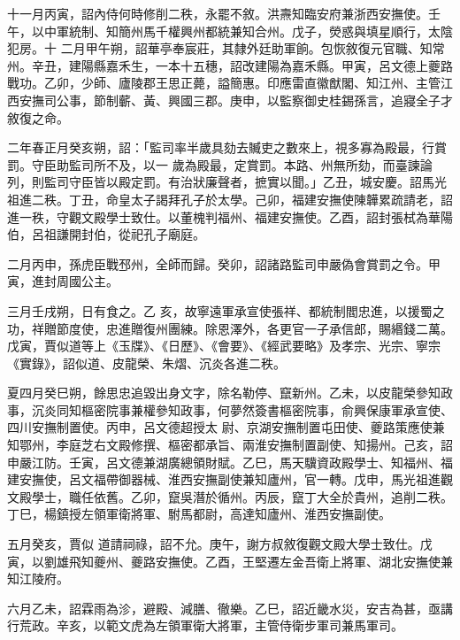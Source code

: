 \begin{pinyinscope}
 十一月丙寅，詔內侍何時修削二秩，永罷不敘。洪燾知臨安府兼浙西安撫使。壬午，以中軍統制、知簡州馬千權興州都統兼知合州。戊子，熒惑與填星順行，太陰犯房。十
 二月甲午朔，詔華亭奉宸莊，其隸外廷助軍餉。包恢敘復元官職、知常州。辛丑，建陽縣嘉禾生，一本十五穗，詔改建陽為嘉禾縣。甲寅，呂文德上夔路戰功。乙卯，少師、廬陵郡王思正薨，謚簡惠。印應雷直徽猷閣、知江州、主管江西安撫司公事，節制蘄、黃、興國三郡。庚申，以監察御史桂錫孫言，追寢全子才敘復之命。



 二年春正月癸亥朔，詔：「監司率半歲具劾去贓吏之數來上，視多寡為殿最，行賞罰。守臣助監司所不及，以一
 歲為殿最，定賞罰。本路、州無所劾，而臺諫論列，則監司守臣皆以殿定罰。有治狀廉聲者，摭實以聞。」乙丑，城安慶。詔馬光祖進二秩。丁丑，命皇太子謁拜孔子於太學。己卯，福建安撫使陳韡累疏請老，詔進一秩，守觀文殿學士致仕。以董槐判福州、福建安撫使。乙酉，詔封張栻為華陽伯，呂祖謙開封伯，從祀孔子廟庭。



 二月丙申，孫虎臣戰邳州，全師而歸。癸卯，詔諸路監司申嚴偽會賞罰之令。甲寅，進封周國公主。



 三月壬戌朔，日有食之。乙
 亥，故寧遠軍承宣使張祥、都統制閻忠進，以援蜀之功，祥贈節度使，忠進贈復州團練。除恩澤外，各更官一子承信郎，賜緡錢二萬。戊寅，賈似道等上《玉牒》、《日歷》、《會要》、《經武要略》及孝宗、光宗、寧宗《實錄》，詔似道、皮龍榮、朱熠、沉炎各進二秩。



 夏四月癸巳朔，餘思忠追毀出身文字，除名勒停、竄新州。乙未，以皮龍榮參知政事，沉炎同知樞密院事兼權參知政事，何夢然簽書樞密院事，俞興保康軍承宣使、四川安撫制置使。丙申，呂文德超授太
 尉、京湖安撫制置屯田使、夔路策應使兼知鄂州，李庭芝右文殿修撰、樞密都承旨、兩淮安撫制置副使、知揚州。己亥，詔申嚴江防。壬寅，呂文德兼湖廣總領財賦。乙巳，馬天驥資政殿學士、知福州、福建安撫使，呂文福帶御器械、淮西安撫副使兼知廬州，官一轉。戊申，馬光祖進觀文殿學士，職任依舊。乙卯，竄吳潛於循州。丙辰，竄丁大全於貴州，追削二秩。丁巳，楊鎮授左領軍衛將軍、駙馬都尉，高達知廬州、淮西安撫副使。



 五月癸亥，賈似
 道請祠祿，詔不允。庚午，謝方叔敘復觀文殿大學士致仕。戊寅，以劉雄飛知夔州、夔路安撫使。乙酉，王堅遷左金吾衛上將軍、湖北安撫使兼知江陵府。



 六月乙未，詔霖雨為沴，避殿、減膳、徹樂。乙巳，詔近畿水災，安吉為甚，亟講行荒政。辛亥，以範文虎為左領軍衛大將軍，主管侍衛步軍司兼馬軍司。




\end{pinyinscope}
